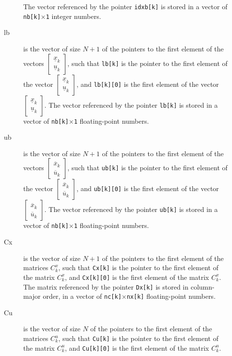 \documentclass{report}
\begin{document}
\begin{description}
\begin{description}
		The vector referenced by the pointer \texttt{idxb[k]} is stored in a vector of \texttt{nb[k]$\times$1} integer numbers.
		\item[lb] is the vector of size $N+1$ of the pointers to the first element of the vectors $\begin{bmatrix} \underline x_k \\ \underline u_k \end{bmatrix}$, such that \texttt{lb[k]} is the pointer to the first element of the vector $\begin{bmatrix} \underline x_k \\ \underline u_k \end{bmatrix}$, and \texttt{lb[k][0]} is the first element of the vector $\begin{bmatrix} \underline x_k \\ \underline u_k \end{bmatrix}$.
		The vector referenced by the pointer \texttt{lb[k]} is stored in a vector of \texttt{nb[k]$\times$1} floating-point numbers.
		\item[ub] is the vector of size $N+1$ of the pointers to the first element of the vectors $\begin{bmatrix} \overline x_k \\ \overline u_k \end{bmatrix}$, such that \texttt{ub[k]} is the pointer to the first element of the vector $\begin{bmatrix} \overline x_k \\ \overline u_k \end{bmatrix}$, and \texttt{ub[k][0]} is the first element of the vector $\begin{bmatrix} \overline x_k \\ \overline u_k \end{bmatrix}$.
		The vector referenced by the pointer \texttt{ub[k]} is stored in a vector of \texttt{nb[k]$\times$1} floating-point numbers.
		\item[Cx] is the vector of size $N+1$ of the pointers to the first element of the matrices $C^x_k$, such that \texttt{Cx[k]} is the pointer to the first element of the matrix $C^x_k$, and \texttt{Cx[k][0]} is the first element of the matrix $C^x_k$.
		The matrix referenced by the pointer \texttt{Dx[k]} is stored in column-major order, in a vector of \texttt{nc[k]$\times$nx[k]} floating-point numbers.
		\item[Cu] is the vector of size $N$ of the pointers to the first element of the matrices $C^u_k$, such that \texttt{Cu[k]} is the pointer to the first element of the matrix $C^u_k$, and \texttt{Cu[k][0]} is the first element of the matrix $C^u_k$.

\end{description}
\end{description}
\end{document}
